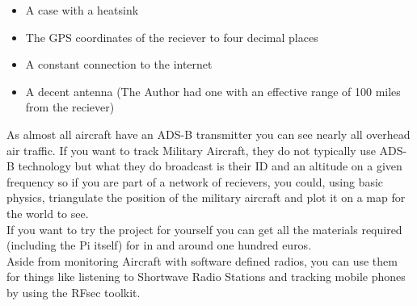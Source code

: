 \documentclass{article}
\begin{document}
		\begin{itemize}
			\item A case with a heatsink
			\item The GPS coordinates of the reciever to four decimal places
			\item A constant connection to the internet
			\item A decent antenna (The Author had one with an effective range of 100 miles from the reciever)
		\end{itemize}
		As almost all aircraft have an ADS-B transmitter you can see nearly all overhead air traffic. If you want to track Military Aircraft, they do not typically use ADS-B technology but what they do broadcast is their ID and an altitude on a given frequency so if you are part of a network of recievers, you could, using basic physics, triangulate the position of the military aircraft and plot it on a map for the world to see.\\If you want to try the project for yourself you can get all the materials required (including the Pi itself) for in and around one hundred euros.\\Aside from monitoring Aircraft with software defined radios, you can use them for things like listening to Shortwave Radio Stations and tracking mobile phones by using the RFsec toolkit.\citep{boardmasterinstructables} \citep{cnxroot}
	\newpage
\end{document}
